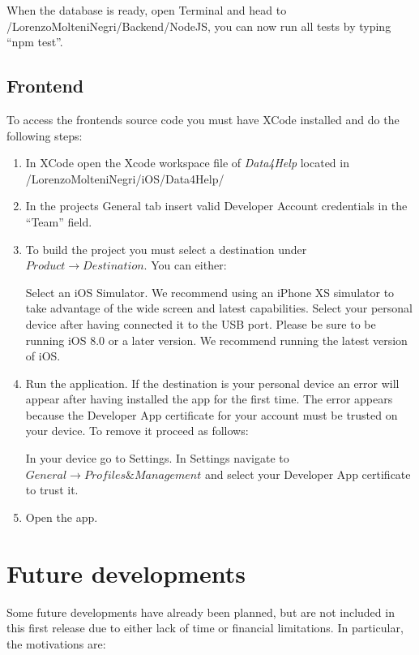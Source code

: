 \documentclass[titlepage]{article}
\begin{document}
	When the database is ready, open Terminal and head to /LorenzoMolteniNegri/Backend/NodeJS, you can now run all tests by typing “npm test”.
	
	\subsection{Frontend}
	To access the frontend\textsc{}s source code you must have XCode installed and do the following steps:
	\begin{enumerate}
		\item In XCode open the Xcode workspace file of {\it Data4Help} located in /LorenzoMolteniNegri/iOS/Data4Help/
		\item In the project\textsc{}s General tab insert valid Developer Account credentials in the “Team” field.
		\item To build the project you must select a destination under $Product \rightarrow Destination$. You can either:
		\begin{tasks}
			\task Select an iOS Simulator. We recommend using an iPhone XS simulator to take advantage of the wide screen and latest capabilities.
			\task Select your personal device after having connected it to the USB port. Please be sure to be running iOS 8.0 or a later version. We recommend running the latest version of iOS.
		\end{tasks}
		\item Run the application. If the destination is your personal device an error will appear after having installed the app for the first time. The error appears because the Developer App certificate for your account must be trusted on your device. To remove it proceed as follows:
		\begin{tasks}
			\task In your device go to Settings.
			\task In Settings navigate to $General\rightarrow Profiles \& Management$ and select your Developer App certificate to trust it.
		\end{tasks}
		\item Open the app.
	\end{enumerate}
	
	\pagebreak
	\section{Future developments}
	Some future developments have already been planned, but are not included in this first release due to either lack of time or financial limitations. In particular, the motivations are:
	
\end{document}
